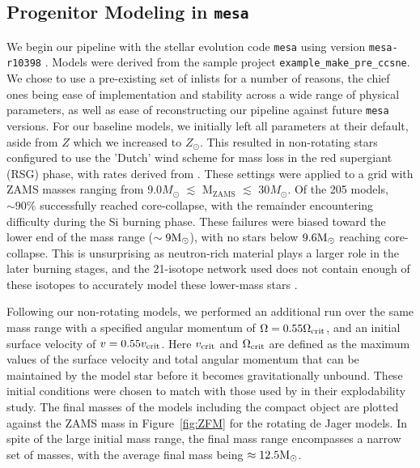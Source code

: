 \documentclass[twocolumn]{aastex631}
\begin{document}
\subsection{Progenitor Modeling in \texttt{mesa}}
\label{mesa}
We begin our pipeline with the stellar evolution code \texttt{mesa} using version \texttt{mesa-r10398} \citep{paxton1,paxton2,paxton3,paxton4,paxton5}. Models were derived from the sample project \texttt{example\_make\_pre\_ccsne}. 
We chose to use a pre-existing set of inlists for a number of reasons, the chief ones being ease of implementation and stability across a wide range of physical parameters, as well as ease of reconstructing our pipeline against future \texttt{mesa} versions. For our baseline models, we initially left all parameters at their default, aside from $Z$ which we increased to $Z_{\odot}$. This resulted in non-rotating stars configured to use the 'Dutch' wind scheme for mass loss in the red supergiant (RSG) phase, with rates derived from \citep{dj88}.  These settings were applied to a grid with ZAMS masses ranging from 9.0$M_{\odot}$ $\lesssim$ M$_{\mathrm{ZAMS}}$ $\lesssim$ 30$M_{\odot}$. Of the 205 models, $\sim 90\%$ successfully reached core-collapse, with the remainder encountering difficulty during the Si burning phase. These failures were biased toward the lower end of the mass range ($\sim 9 \rm M_{\odot}$), with no stars below $9.6 \rm M_{\odot}$ reaching core-collapse. This is unsurprising as neutron-rich material plays a larger role in the later burning stages, and the 21-isotope network used  does not contain enough of these isotopes to accurately model these lower-mass stars \citep{paxton3}.

Following our non-rotating models, we performed an additional run over the same mass range with a specified angular momentum of $\Omega=0.55\Omega_{\rm crit}$, and an initial surface velocity of $v=0.55v_{\rm crit}$. Here $v_{\rm crit}$ and $\Omega_{\rm crit}$ are defined as the maximum values of the surface velocity and total angular momentum that can be maintained by the model star before it becomes gravitationally unbound. These initial conditions were chosen to match with those used by \citet{renzo} in their explodability study.  The final masses of the models including the compact object are plotted against the ZAMS mass in Figure~\ref{fig:ZFM} for the rotating de Jager models. In spite of the large initial mass range, the final mass range encompasses a narrow set of masses, with the average final mass being $\approx 12.5 \rm M_{\odot}$. 
\end{document}
